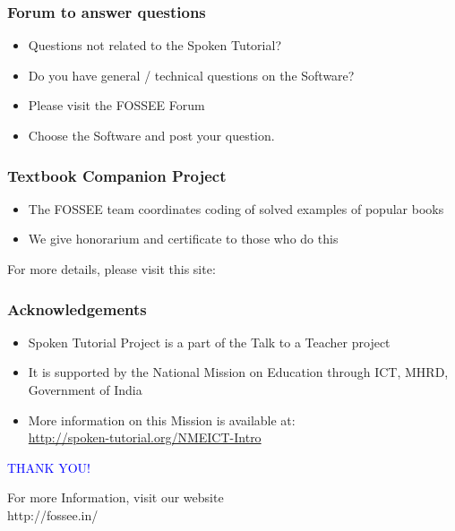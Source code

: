 \documentclass[17pt]{beamer}
\begin{document}
\begin{frame}
\frametitle{Forum to answer questions}
\begin{itemize}
\item Questions not related to the Spoken Tutorial?
\item Do you have general / technical questions on the Software?
\item Please visit the FOSSEE Forum
\begin{center}
{\color{blue}{http://forums.fossee.in/}}
 \end{center}
\item Choose the Software and post your question.
\end{itemize}
\end{frame}
\begin{frame}
\frametitle{Textbook Companion Project}
\begin{itemize}
\item The FOSSEE team coordinates coding of solved examples of popular
  books 
\item We give honorarium and certificate to those who do this
\end{itemize}
For more details, please visit this site:
\begin{center}
{\color{blue}{http://tbc-python.fossee.in/}}
\end{center}
\end{frame}
\begin{frame}
\frametitle{Acknowledgements}
\begin{itemize}
\item Spoken Tutorial Project is a part of the Talk to a Teacher  project 
\item It is supported by the National Mission on Education through  ICT, MHRD, Government of India 
\item More information on this Mission is available at: \\{\color{blue}\url{http://spoken-tutorial.org/NMEICT-Intro}}
\end{itemize}
\end{frame}
\begin{frame}

  \begin{block}{}
  \begin{center}
  \textcolor{blue}{\Large THANK YOU!} 
  \end{center}
  \end{block}
\begin{block}{}
  \begin{center}
    For more Information, visit our website\\
    {http://fossee.in/}
  \end{center}  
  \end{block}
\end{frame}
\end{document}
